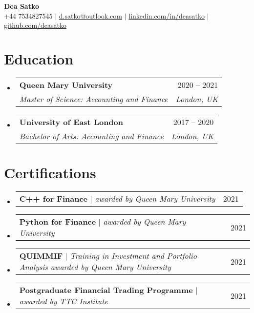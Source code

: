 \documentclass[letterpaper,11pt]{article}
\makeatletter
\newcommand{\resumeSubheading}[4]{
  \vspace{-2pt}\item
    \begin{tabular*}{0.97\textwidth}[t]{l@{\extracolsep{\fill}}r}
      \textbf{#1} & #2 \\
      \textit{\small#3} & \textit{\small #4} \\
    \end{tabular*}\vspace{-7pt}
}
\newcommand{\resumeProjectHeading}[2]{
    \item
    \begin{tabular*}{0.97\textwidth}{l@{\extracolsep{\fill}}r}
      \small#1 & #2 \\
    \end{tabular*}\vspace{-7pt}
}
\newcommand{\resumeSubHeadingListStart}{\begin{itemize}[leftmargin=0.15in, label={}]}
\newcommand{\resumeSubHeadingListEnd}{\end{itemize}}
\makeatother
\begin{document}
\begin{center}
    \textbf{\Huge Dea Satko} \\ \vspace{1pt}
    \small +44 7534827545 $|$ \href{mailto:d.satko@outlook.com}{{d.satko@outlook.com}} $|$ 
    \href{https://www.linkedin.com/in/deasatko/}{{linkedin.com/in/deasatko}} $|$
    \href{https://github.com/deasatko/}{{github.com/deasatko}}
\end{center}


\section{Education}
  \resumeSubHeadingListStart
    \resumeSubheading
      {Queen Mary University}{2020 -- 2021}
      {Master of Science: Accounting and Finance}{London, UK}
    \resumeSubheading
      {University of East London}{2017 -- 2020}
      {Bachelor of Arts: Accounting and Finance}{London, UK}
  \resumeSubHeadingListEnd

\section{Certifications}
  \resumeSubHeadingListStart
    \resumeProjectHeading
      {\textbf{C++ for Finance} $|$ \emph{awarded by Queen Mary University}}{2021}
    \resumeProjectHeading
      {\textbf{Python for Finance} $|$ \emph{awarded by Queen Mary University}}{2021}
    \resumeProjectHeading
      {\textbf{QUIMMIF} $|$ \emph{Training in Investment and Portfolio Analysis awarded by Queen Mary University}}{2021}
    \resumeProjectHeading
      {\textbf{Postgraduate Financial Trading Programme} $|$ \emph{awarded by TTC Institute}}{2021}
\resumeSubHeadingListEnd

\end{document}
